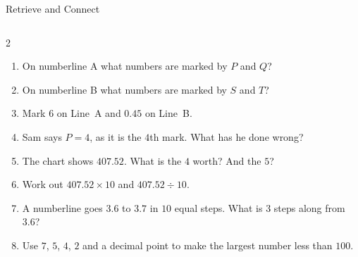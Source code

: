 \documentclass{beamer}
\newcommand{\ashow}[1]{\uncover<2->{\textcolor{red}{\small #1}}}
\newcommand{\qtight}{%
  \setlength{\itemsep}{0pt}\setlength{\parskip}{0pt}\setlength{\parsep}{0pt}%
  \setlength{\topsep}{0pt}\setlength{\partopsep}{0pt}%
}
\begin{document}
\begin{frame}{Retrieve and Connect}
\begin{columns}[T]

\small
\begin{multicols}{2}
\begin{enumerate}\qtight

  \item On numberline A what numbers are marked by  $P$ and $Q$? \ashow{$3$ and $8$}

  \item On numberline B what numbers are marked by  $S$ and $T$? \ashow{$0.3$ and $0.9$}

  \item Mark $6$ on Line~A and $0.45$ on Line~B.

  \item Sam says $P=4$, as it is the $4$th mark. What has he done wrong? \ashow{Counted marks, not steps: $P=3$}
  \columnbreak

  \item The chart shows $407.52$. What is the $4$ worth? And the $5$? \ashow{$400$ and $0.5$}


  \item Work out $407.52\times 10$ and $407.52\div 10$. \ashow{$4075.2$ and $40.752$}

  \item A numberline goes $3.6$ to $3.7$ in $10$ equal steps. What is $3$ steps along from $3.6$? \ashow{$3.63$}

  \item Use $7$, $5$, $4$, $2$ and a decimal point to make the largest number less than $100$. \ashow{$75.42$}

\end{enumerate}
\end{multicols}

\end{columns}

\end{frame}
\end{document}
